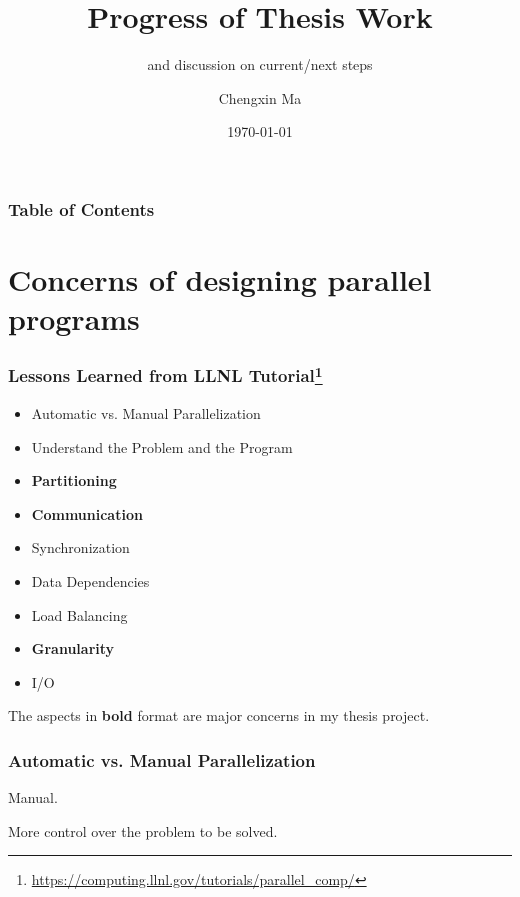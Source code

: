 \documentclass{beamer}
\title[Progress of Thesis Work] %
{Progress of Thesis Work}
\subtitle {and discussion on current/next steps}
\author[C Ma] %
{Chengxin Ma}
\institute[TU Delft] %
{
  \inst{}
  Faculty of Electrical Engineering, Mathematics and Computer Science \\
  Delft University of Technology
}
\date{\today}
\begin{document}
\frame{\titlepage}

\begin{frame}
\frametitle{Table of Contents}
\tableofcontents
\end{frame}

\section{Concerns of designing parallel programs}

\begin{frame}
\frametitle{Lessons Learned from LLNL Tutorial\footnote{\url{https://computing.llnl.gov/tutorials/parallel_comp/}}}

\begin{itemize}
  \item Automatic vs. Manual Parallelization
  \item Understand the Problem and the Program
  \item \textbf{Partitioning}
  \item \textbf{Communication}
  \item Synchronization
  \item Data Dependencies
  \item Load Balancing
  \item \textbf{Granularity}
  \item I/O
\end{itemize}

The aspects in \textbf{bold} format are major concerns in my thesis project.

\end{frame}

\begin{frame}
\frametitle{Automatic vs. Manual Parallelization}

Manual.

More control over the problem to be solved.
  
\end{frame}
\end{document}
